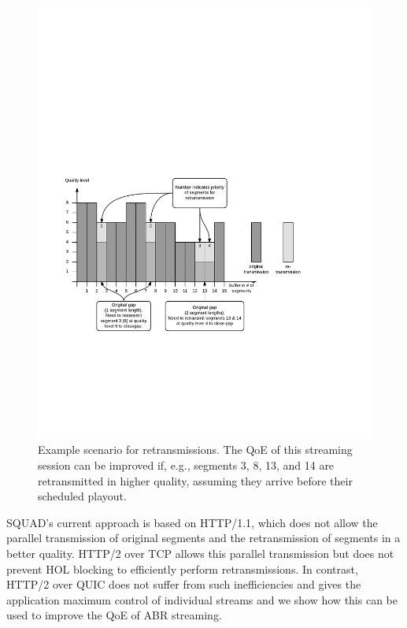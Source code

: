 \begin{figure}
\centering
\includegraphics[width=.9\linewidth] {figures/Retrans_example.pdf}
\caption{Example scenario for retransmissions. The QoE of this streaming session can be improved if, e.g., segments 3, 8, 13, and 14 are retransmitted in higher quality, assuming they arrive before their scheduled playout.}
\label{fig:retrans}
\vspace{-8pt}
\end{figure}

SQUAD's current approach is based on HTTP/1.1, which does not allow the parallel transmission of original segments and the retransmission of segments in a better quality. HTTP/2 over TCP allows this parallel transmission but does not prevent HOL blocking to efficiently perform retransmissions. In contrast, HTTP/2 over QUIC does not suffer from such inefficiencies and gives the application maximum control of individual streams and we show how this can be used to improve the QoE of ABR streaming.
